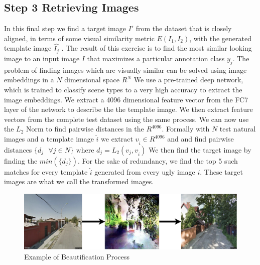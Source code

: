 \subsection*{Step 3 Retrieving Images }
In this final step we find a target image $I'$ from the dataset that is closely aligned, in terms of some visual similarity metric $E(I_1, I_2)$, with the generated template image  $\hat{I_j}$ . The result of this exercise is to find the most similar looking image to an input image $I$ that maximizes a particular annotation class $y_j$.
The problem of finding images which are visually similar can be solved using image embeddings in a $N$ dimensional space $R^N$
We use a pre-trained deep  network, which is trained to classify scene types to a very high accuracy \cite{zhou2014learning} to extract the image embeddings. We extract a 4096 dimensional feature vector from the FC7 layer of the network to describe the the template image. We then extract feature vectors from the complete test dataset using the same process. We can now use the $L_2$ Norm to find pairwise distances in the $R^{4096}$. Formally with $N$ test natural images and a template image $\hat{i}$ we extract $v_{\hat{i}} \in R^{4096}$ and and find pairwise distances  $\{d_j \text{  }\forall j \in N\} \text{ where } d_j = L_2(v_j , v_{\hat{i}})$ 
We then find the target image by finding the $min(\{d_j\})$. For the sake of redundancy, we find the top 5 such matches for every template $\hat{i}$ generated from every ugly image $i$. These target images are what we call the transformed images.

\begin{figure}[h]
	\centering
	\includegraphics[width=0.5\linewidth]{Plot/Example.png}
	\caption{Example of Beautification Process}
	\label{fig:BeautyExample}
\end{figure}

